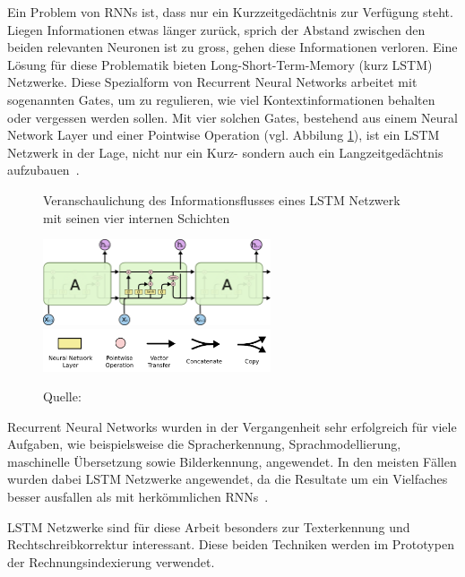 Ein Problem von RNNs ist, dass nur ein Kurzzeitgedächtnis zur Verfügung steht. Liegen Informationen etwas länger zurück, sprich der Abstand zwischen den beiden relevanten Neuronen ist zu gross, gehen diese Informationen verloren. Eine Lösung für diese Problematik bieten Long-Short-Term-Memory (kurz LSTM) Netzwerke. Diese Spezialform von Recurrent Neural Networks arbeitet mit sogenannten Gates, um zu regulieren, wie viel Kontextinformationen behalten oder vergessen werden sollen. Mit vier solchen Gates, bestehend aus einem Neural Network Layer und einer Pointwise Operation (vgl. Abbilung \ref{lstm1}), ist ein LSTM Netzwerk in der Lage, nicht nur ein Kurz- sondern auch ein Langzeitgedächtnis aufzubauen~\autocite{Olah2015}.
\begin{figure}[h]
    \captionsetup{width=.9\linewidth}
    \caption[Veranschaulichung des Informationsflusses eines LSTM Netzwerk]{Veranschaulichung des Informationsflusses eines LSTM Netzwerk mit seinen vier internen Schichten}
    \label{lstm1}
    \centering
    \includegraphics[width=0.6\textwidth]{graphics/lstm.png}\\
    \vspace{0.5cm}
    \includegraphics[width=0.6\textwidth]{graphics/lstm-notation.png}\\
    \vspace{0.1cm}
    \caption*{Quelle: \textcite{Olah2015}}
\end{figure}

Recurrent Neural Networks wurden in der Vergangenheit sehr erfolgreich für viele Aufgaben, wie beispielsweise die Spracherkennung, Sprachmodellierung, maschinelle Übersetzung sowie Bilderkennung, angewendet. In den meisten Fällen wurden dabei LSTM Netzwerke angewendet, da die Resultate um ein Vielfaches besser ausfallen als mit herkömmlichen RNNs~\autocite{Olah2015}.

LSTM Netzwerke sind für diese Arbeit besonders zur Texterkennung und Rechtschreibkorrektur interessant. Diese beiden Techniken werden im Prototypen der Rechnungsindexierung verwendet.

